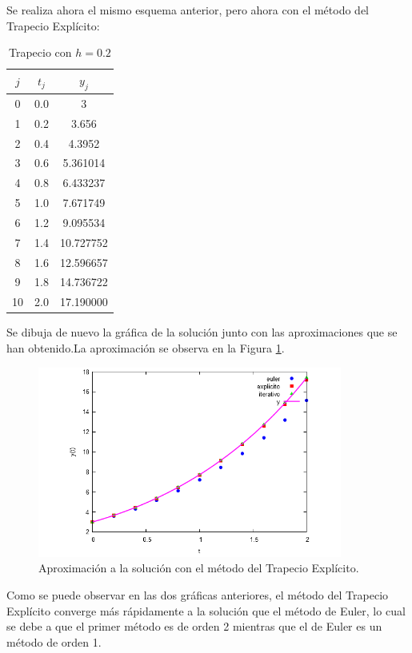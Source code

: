 \documentclass{article}
\theoremstyle{theorem-style}  %
\theoremstyle{definition-style}
\theoremstyle{example-style}
\begin{document}
Se realiza ahora el mismo esquema anterior, pero ahora con el método del Trapecio Explícito:

	\begin{table}[H]
		\centering
		\begin{tabular}{|| c | c | c ||}
			\hline
			\hline $j$ &  $t_j $ & $y_j$\\
			\hline 0 & 0.0 & 3 \\
			\hline 1 & 0.2 & 3.656  \\
			\hline 2 & 0.4 & 4.3952 \\
			\hline 3 & 0.6 & 5.361014 \\
			\hline 4 & 0.8 & 6.433237 \\
			\hline 5 & 1.0 & 7.671749 \\
			\hline 6 & 1.2 & 9.095534 \\
			\hline 7 & 1.4 & 10.727752 \\
			\hline 8 & 1.6 & 12.596657 \\
			\hline 9 & 1.8 & 14.736722 \\
			\hline 10 & 2.0 & 17.190000 \\
		\end{tabular}
		\caption{Trapecio con $h=0.2$}
		\label{table:trapecio-ejtp1.2}
	\end{table}

Se dibuja de nuevo la gráfica de la solución junto con las aproximaciones que se han obtenido.La aproximación se observa en la Figura \ref{fig:aprox2}.

	\begin{figure}[h]
		\centering
		\includegraphics[width=10cm]{./Images/ejtp1-2.png}
		\caption{Aproximación a la solución con el método del Trapecio Explícito.}
		\label{fig:aprox2}
	\end{figure}

Como se puede observar en las dos gráficas anteriores, el método del Trapecio Explícito converge más rápidamente a la solución que el método de Euler, lo cual se debe a que el primer método es de orden 2 mientras que el de Euler es un método de orden 1.\\
\end{document}
